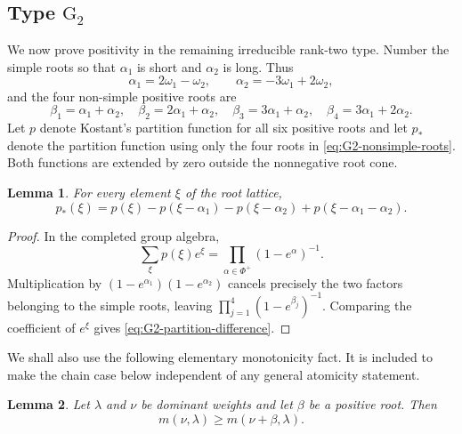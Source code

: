 \documentclass[11pt]{article}
\newtheorem{lemma}[lemma]{Lemma}
\theoremstyle{definition}
\theoremstyle{remark}
\newcommand{\Raiz}{\Phi}
\newcommand{\typeG}{\ensuremath{\mathrm{G}}}
\begin{document}
\subsection{Type $\typeG_2$}\label{subsec:G2}

We now prove positivity in the remaining irreducible rank-two type.  Number the
simple roots so that $\alpha_1$ is short and $\alpha_2$ is long.  Thus
\begin{equation}\label{eq:G2-simple-fundamental}
 \alpha_1=2\omega_1-\omega_2,
 \qquad
 \alpha_2=-3\omega_1+2\omega_2,
\end{equation}
and the four non-simple positive roots are
\begin{equation}\label{eq:G2-nonsimple-roots}
 \beta_1=\alpha_1+\alpha_2,\quad
 \beta_2=2\alpha_1+\alpha_2,\quad
 \beta_3=3\alpha_1+\alpha_2,\quad
 \beta_4=3\alpha_1+2\alpha_2.
\end{equation}
Let $p$ denote Kostant's partition function for all six positive roots and let
$p_*$ denote the partition function using only the four roots in
\eqref{eq:G2-nonsimple-roots}.  Both functions are extended by zero outside the
nonnegative root cone.

\begin{lemma}\label{lem:G2-partition-difference}
For every element $\xi$ of the root lattice,
\begin{equation}\label{eq:G2-partition-difference}
 p_*(\xi)
 =p(\xi)-p(\xi-\alpha_1)-p(\xi-\alpha_2)
      +p(\xi-\alpha_1-\alpha_2).
\end{equation}
\end{lemma}

\begin{proof}
In the completed group algebra,
\[
 \sum_\xi p(\xi)e^\xi
   =\prod_{\alpha\in\Raiz^+}(1-e^\alpha)^{-1}.
\]
Multiplication by $(1-e^{\alpha_1})(1-e^{\alpha_2})$ cancels precisely the
two factors belonging to the simple roots, leaving
$\prod_{j=1}^4(1-e^{\beta_j})^{-1}$.  Comparing the coefficient of $e^\xi$
gives \eqref{eq:G2-partition-difference}.
\end{proof}

We shall also use the following elementary monotonicity fact.  It is included
to make the chain case below independent of any general atomicity statement.

\begin{lemma}\label{lem:root-string-monotonicity}
Let $\lambda$ and $\nu$ be dominant weights and let $\beta$ be a positive root.
Then
\[
       m(\nu,\lambda)\ge m(\nu+\beta,\lambda).
\]
\end{lemma}
\end{document}
